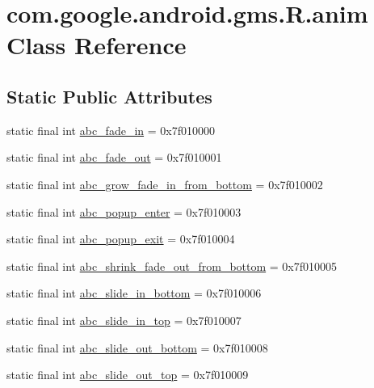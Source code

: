 \hypertarget{classcom_1_1google_1_1android_1_1gms_1_1R_1_1anim}{}\section{com.\+google.\+android.\+gms.\+R.\+anim Class Reference}
\label{classcom_1_1google_1_1android_1_1gms_1_1R_1_1anim}
\subsection*{Static Public Attributes}
\begin{DoxyCompactItemize}
\item 
static final int \mbox{\hyperlink{classcom_1_1google_1_1android_1_1gms_1_1R_1_1anim_ad3210a97c69dc4b5c1008bb83e4e509f}{abc\+\_\+fade\+\_\+in}} = 0x7f010000
\item 
static final int \mbox{\hyperlink{classcom_1_1google_1_1android_1_1gms_1_1R_1_1anim_a1a9195f368b1e1a1587da7c9c000ddff}{abc\+\_\+fade\+\_\+out}} = 0x7f010001
\item 
static final int \mbox{\hyperlink{classcom_1_1google_1_1android_1_1gms_1_1R_1_1anim_a03a58bf231791c777596b50f056c59a6}{abc\+\_\+grow\+\_\+fade\+\_\+in\+\_\+from\+\_\+bottom}} = 0x7f010002
\item 
static final int \mbox{\hyperlink{classcom_1_1google_1_1android_1_1gms_1_1R_1_1anim_a13b18a61e5cb778e4f668829109f7170}{abc\+\_\+popup\+\_\+enter}} = 0x7f010003
\item 
static final int \mbox{\hyperlink{classcom_1_1google_1_1android_1_1gms_1_1R_1_1anim_a020c72d4d55da45faa278292e08d8243}{abc\+\_\+popup\+\_\+exit}} = 0x7f010004
\item 
static final int \mbox{\hyperlink{classcom_1_1google_1_1android_1_1gms_1_1R_1_1anim_a83e2342339f62e6eabe2349c53db9eb2}{abc\+\_\+shrink\+\_\+fade\+\_\+out\+\_\+from\+\_\+bottom}} = 0x7f010005
\item 
static final int \mbox{\hyperlink{classcom_1_1google_1_1android_1_1gms_1_1R_1_1anim_aee3895d5ba41075e57b8652e90fa4823}{abc\+\_\+slide\+\_\+in\+\_\+bottom}} = 0x7f010006
\item 
static final int \mbox{\hyperlink{classcom_1_1google_1_1android_1_1gms_1_1R_1_1anim_a2a337a0e82b61a46aa6014102eaf9607}{abc\+\_\+slide\+\_\+in\+\_\+top}} = 0x7f010007
\item 
static final int \mbox{\hyperlink{classcom_1_1google_1_1android_1_1gms_1_1R_1_1anim_ae2792ca4acb4c21e6d6a3af79295cb51}{abc\+\_\+slide\+\_\+out\+\_\+bottom}} = 0x7f010008
\item 
static final int \mbox{\hyperlink{classcom_1_1google_1_1android_1_1gms_1_1R_1_1anim_a9eab3618ac390522898bab521a11475f}{abc\+\_\+slide\+\_\+out\+\_\+top}} = 0x7f010009
\end{DoxyCompactItemize}



